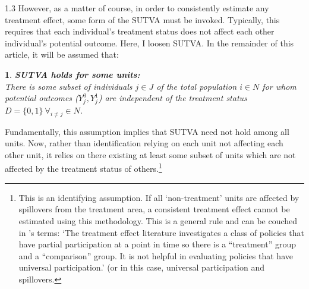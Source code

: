 \documentclass[12pt]{article}
\makeatletter
\newtheorem*{assumption*}{\assumptionnumber}
\providecommand{\assumptionnumber}{}
\newenvironment{assumption}[2]
 {%
  \renewcommand{\assumptionnumber}{Assumption #1{#2}}%
  \begin{assumption*}%
  \protected@edef\@currentlabel{#1}%
 }
 {%
  \end{assumption*}
 }
\makeatother
\begin{document}
\begin{spacing}{1.3}
However, as a matter of course, in order to consistently estimate any treatment 
effect, some form of the SUTVA must be invoked.  Typically, this requires that 
each individual's treatment status does not affect each other individual's 
potential outcome.  Here, I loosen SUTVA. In the remainder of this article, it 
will be assumed that:
\begin{assumption}{3}{}
\label{Sass:SUTVAs}
\textbf{SUTVA holds for some units:} \\
There is some subset of individuals $j\in J$ of the total population $i\in N$ 
for whom potential outcomes ($Y_j^0, Y_j^1$) are independent of the treatment 
status $D=\{0,1\}\ \forall_{i\neq j} \in N$.
\end{assumption}
\vspace{-4mm}
\noindent Fundamentally, this assumption implies that SUTVA need not hold among 
all units.  Now, rather than identification relying on each unit not affecting 
each other unit, it relies on there existing at least some subset of units which 
are not affected by the treatment status of others.\footnote{This is an 
identifying assumption. If all `non-treatment' units are affected by spillovers 
from the treatment area, a consistent treatment effect cannot be estimated using 
this methodology. This is a general rule and can be couched in 
\citet{HeckmanVytlacil2005}'s terms: `The treatment effect literature 
investigates a class of policies that have partial participation at a point in 
time so there is a ``treatment'' group and a ``comparison'' group. It is not 
helpful in evaluating policies that have universal participation.' (or in this 
case, universal participation and spillovers.}


\end{spacing}
\end{document}
